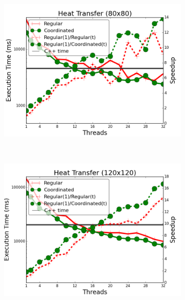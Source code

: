 \begin{figure}[]
        \centering
        \begin{subfigure}[b]{\plotsize\textwidth}
           \includegraphics[width=\textwidth]{experiments/coordination/cmp-new-heat-transfer-80.png}
           \label{fig:coordination:coord_ht_80}
        \end{subfigure}
        ~
        \begin{subfigure}[b]{\plotsize\textwidth}
           \includegraphics[width=\textwidth]{experiments/coordination/cmp-new-heat-transfer-120.png}
           \label{fig:coordination:coord_ht_120}
        \end{subfigure} \\
        \label{fig:coordination:results_ht}
\end{figure}


